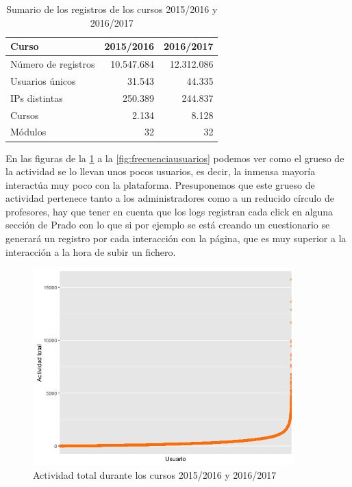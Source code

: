 \begin{table}[H]
\centering
\begin{tabular}{|l|r|r|}
\hline
\textbf{Curso}        & \textbf{2015/2016}	& \textbf{2016/2017}\\ \hline
Número de registros & 10.547.684     		& 12.312.086			\\ \hline
Usuarios únicos     & 31.543        			& 44.335				\\ \hline
IPs distintas       & 250.389       			& 244.837			\\ \hline
Cursos              & 2.134         			& 8.128				\\ \hline
Módulos             & 32            			& 32					\\ \hline
\end{tabular}
\caption{Sumario de los registros de los cursos 2015/2016 y 2016/2017}
\label{table:sumarioregistros}
\end{table}


En las figuras de la \ref{fig:actividadtotal} a la \ref{fig:frecuenciausuarios} podemos ver como el grueso de la actividad se lo llevan unos pocos usuarios, es decir, la inmensa mayoría interactúa muy poco con la plataforma. Presuponemos que este grueso de actividad pertenece tanto a los administradores como a un reducido círculo de profesores, hay que tener en cuenta que los logs registran cada click en alguna sección de Prado con lo que si por ejemplo se está creando un cuestionario se generará un registro por cada interacción con la página, que es muy superior a la interacción a la hora de subir un fichero.

\begin{figure}[H]
\centering
\includegraphics[width=0.9\textwidth]{../r/actividadtotal}
\caption{Actividad total durante los cursos 2015/2016 y 2016/2017}
\label{fig:actividadtotal}
\end{figure}

